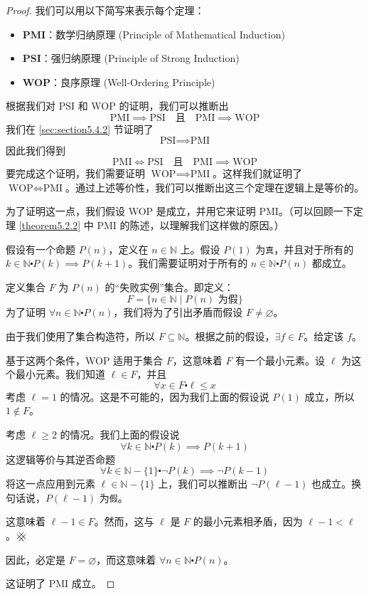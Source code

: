 \begin{proof}
    我们可以用以下简写来表示每个定理：
    \begin{itemize}
        \item \textbf{PMI}：数学归纳原理 (Principle of Mathematical Induction)
        \item \textbf{PSI}：强归纳原理 (Principle of Strong Induction)
        \item \textbf{WOP}：良序原理 (Well-Ordering Principle)
    \end{itemize}
    根据我们对 PSI 和 WOP 的证明，我们可以推断出
    \[\text{PMI} \implies \text{PSI} \quad\text{且}\quad \text{PMI} \implies \text{WOP}\]
    我们在 \ref{sec:section5.4.2} 节证明了
    \[\text{PSI} \implies \text{PMI}\]
    因此我们得到
    \[\text{PMI} \iff \text{PSI} \quad\text{且}\quad \text{PMI} \implies \text{WOP}\]
    要完成这个证明，我们需要证明 $\text{WOP} \implies \text{PMI}$。这样我们就证明了 $\text{WOP} \iff \text{PMI}$。通过上述等价性，我们可以推断出这三个定理在逻辑上是等价的。

    为了证明这一点，我们假设 WOP 是成立，并用它来证明 PMI。（可以回顾一下定理 \ref{theorem5.2.2} 中 PMI 的陈述，以理解我们这样做的原因。）

    假设有一个命题 $P(n)$，定义在 $n \in \mathbb{N}$ 上。假设 $P(1)$ 为\verb|真|，并且对于所有的 $k \in \mathbb{N} \centerdot P(k) \implies P(k+1)$。我们需要证明对于所有的 $n \in \mathbb{N} \centerdot P(n)$ 都成立。


    定义集合 $F$ 为 $P(n)$ 的``失败实例''集合。即定义：
    \[F = \{n \in \mathbb{N} \mid P(n) \text{ 为假}\}\]
    为了证明 $\forall n \in \mathbb{N} \centerdot P(n)$，我们将为了引出矛盾而假设 $F \ne \varnothing$。

    由于我们使用了集合构造符，所以 $F \subseteq \mathbb{N}$。根据之前的假设，$\exists f \in F$。给定该 $f$。

    基于这两个条件，WOP 适用于集合 $F$，这意味着 $F$ 有一个最小元素。设 $\ell$ 为这个最小元素。我们知道 $\ell \in F$，并且
    \[\forall x \in F \centerdot \ell \le x\]
    考虑 $\ell = 1$ 的情况。这是不可能的，因为我们上面的假设说 $P(1)$ 成立，所以 $1 \notin F$。

    考虑 $\ell \ge 2$ 的情况。我们上面的假设说
    \[\forall k \in \mathbb{N} \centerdot P(k) \implies P(k+1)\]
    这逻辑等价与其逆否命题
    \[\forall k \in \mathbb{N} - \{1\} \centerdot \neg P(k) \implies \neg P(k-1)\]
    将这一点应用到元素 $\ell \in \mathbb{N} - \{1\}$ 上，我们可以推断出 $\neg P(\ell - 1)$ 也成立。换句话说，$P(\ell-1)$ 为\verb|假|。

    这意味着 $\ell-1 \in F$。然而，这与 $\ell$ 是 $F$ 的最小元素相矛盾，因为 $\ell - 1 < \ell$。$\hashx$

    因此，必定是 $F = \varnothing$，而这意味着 $\forall n \in \mathbb{N} \centerdot P(n)$。

    这证明了 PMI 成立。
\end{proof}

